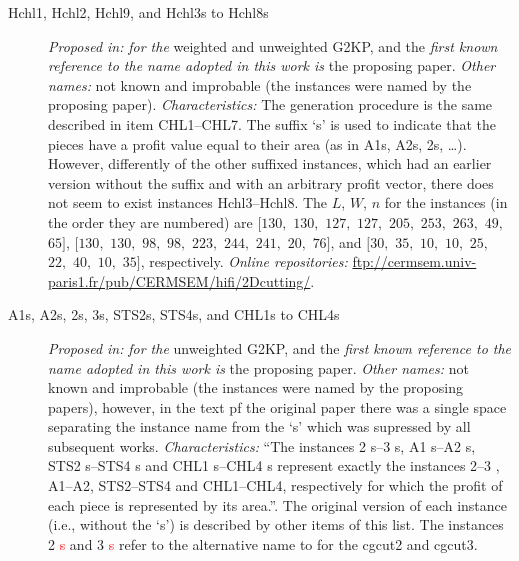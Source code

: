 \documentclass[ppgc,tese,english,formais,babel]{iiufrgs}
\newif\iffinalversion
\newcommand{\oldtext}[1]{\iffinalversion%
\else%
\textcolor{red}{#1}%
\fi%
}
\begin{document}
\begin{description}
\item [Hchl1, Hchl2, Hchl9, and Hchl3s to Hchl8s] \emph{Proposed in:} \citet{cung:2000} \emph{for the} weighted and unweighted G2KP, and the \emph{first known reference to the name adopted in this work is} the proposing paper. \emph{Other names:} not known and improbable (the instances were named by the proposing paper). \emph{Characteristics: } The generation procedure is the same described in item CHL1--CHL7. The suffix `s' is used to indicate that the pieces have a profit value equal to their area (as in A1s, A2s, 2s, \dots). However, differently of the other suffixed instances, which had an earlier version without the suffix and with an arbitrary profit vector, there does not seem to exist instances Hchl3--Hchl8. The \(L\), \(W\), \(n\) for the instances (in the order they are numbered) are \([130,\) \(130,\) \(127,\) \(127,\) \(205,\) \(253,\) \(263,\) \(49,\) \(65]\), \([130,\) \(130,\) \(98,\) \(98,\) \(223,\) \(244,\) \(241,\) \(20,\) \(76]\), and \([30,\) \(35,\) \(10,\) \(10,\) \(25,\) \(22,\) \(40,\) \(10,\) \(35]\), respectively. \emph{Online repositories:} \url{ftp://cermsem.univ-paris1.fr/pub/CERMSEM/hifi/2Dcutting/}.
\item [A1s, A2s, 2s, 3s, STS2s, STS4s, and CHL1s to CHL4s] \emph{Proposed in:} \citet{cung:2000} \emph{for the} unweighted G2KP, and the \emph{first known reference to the name adopted in this work is} the proposing paper. \emph{Other names:} not known and improbable (the instances were named by the proposing papers), however, in the text pf the original paper there was a single space separating the instance name from the `s' which was supressed by all subsequent works. \emph{Characteristics: } ``The instances 2 s--3 s, A1 s--A2 s, STS2 s--STS4 s and CHL1 s--CHL4 s represent exactly the instances 2--3 , A1--A2, STS2--STS4 and CHL1--CHL4, respectively for which the profit of each piece is represented by its area.''. \citep{cung:2000} The original version of each instance (i.e., without the `s') is described by other items of this list. The instances 2\oldtext{s} and 3\oldtext{s} refer to the alternative name to for the cgcut2 and cgcut3.

\end{description}
\end{document}
